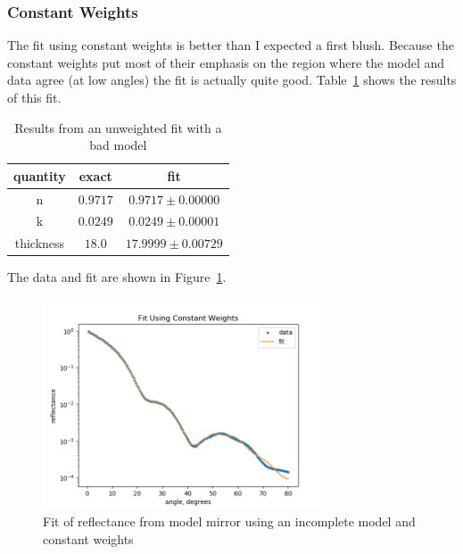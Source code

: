 \documentclass[english]{scrartcl}
\begin{document}
\subsubsection{Constant Weights}
The fit using constant weights is better than I expected
a first blush. Because the constant weights put most
of their emphasis on the region where the model and data
agree (at low angles) the fit is actually quite good.
Table~\ref{tab:mconst} shows the results of this fit.
\begin{table}[htb]
	\begin{center}
		\begin{tabular}{| c | c | c |}
			\hline
			quantity & exact & fit\\ \hline\hline
			n & $0.9717$ & $0.9717\pm 0.00000$\\
			k & $0.0249$ & $0.0249\pm 0.00001$\\
			thickness & $18.0$ & $17.9999\pm 0.00729$\\ \hline
		\end{tabular}
	\end{center}
	\caption{\label{tab:mconst}Results from an unweighted fit with a bad model}
\end{table}
The data and fit are shown in Figure~\ref{fig:mconst}.
\begin{figure}[htb]
	\begin{center}
		\includegraphics[width=0.75\textwidth]{images/mconst}
	\end{center}
	\caption{\label{fig:mconst}Fit of reflectance from model mirror using an incomplete model and constant weights}
\end{figure}
\end{document}
